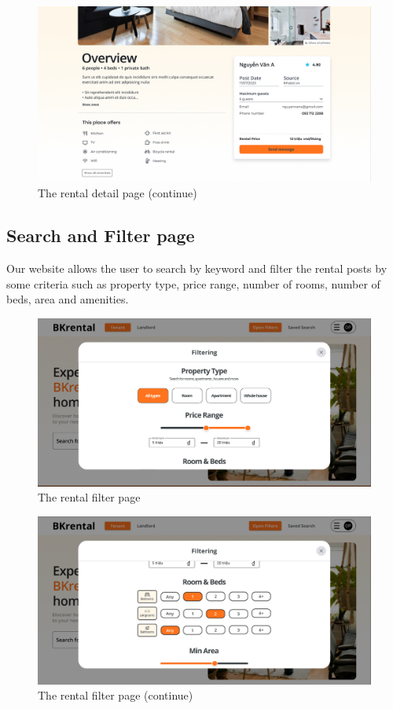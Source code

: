 \begin{figure}[ht]
    \centering
    \includegraphics[width=\textwidth]{Images/Mockup/rental_detail_2.png}
    \caption{The rental detail page (continue)}
    \label{fig:rental-detail-page-2}
\end{figure}
\clearpage

\subsection{Search and Filter page}
Our website allows the user to search by keyword and filter the rental posts by some criteria such as property type, price range, number of rooms, number of beds, area and amenities. 

\begin{figure}[ht]
    \centering
    \includegraphics[width=\textwidth]{Images/Mockup/rental_filter_1.png}
    \caption{The rental filter page}
    \label{fig:rental-filter-1} 
\end{figure}

\begin{figure}[ht]
    \centering
    \includegraphics[width=\textwidth]{Images/Mockup/rental_filter_2.png}
    \caption{The rental filter page (continue)}
    \label{fig:rental-filter-2} 
\end{figure}

